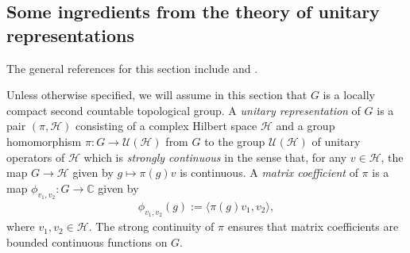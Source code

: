 \documentclass[psamsfonts]{amsart}
\theoremstyle{definition}
\theoremstyle{remark}
\numberwithin{equation}{section}
\begin{document}
\subsection{Some ingredients from the theory of unitary representations}
The general references for this section include \cite{BdV} and \cite{Kn2}.
\par 
Unless otherwise specified, we will assume in this section that $G$ is a locally compact second countable topological group. A \emph{unitary representation} of $G$ is a pair $(\pi, \mathcal{H})$ consisting of a complex Hilbert space $\mathcal{H}$ and a group homomorphism $\pi : G \rightarrow \mathcal{U}(\mathcal{H})$ from $G$ to the group $\mathcal{U}(\mathcal{H})$ of unitary operators of $\mathcal{H}$ which is \emph{strongly continuous} in the sense that, for any $v \in \mathcal{H}$, the map $G \rightarrow \mathcal{H}$ given by $g \mapsto \pi(g)v$ is continuous. A \emph{matrix coefficient} of $\pi$ is a map $\phi_{v_{1}, v_{2}} : G \rightarrow \mathbb{C}$ given by
\begin{align*}
\phi_{v_{1}, v_{2}}(g) := \langle \pi(g)v_{1}, v_{2} \rangle,
\end{align*} where $v_{1}, v_{2} \in \mathcal{H}$. The strong continuity of $\pi$ ensures that matrix coefficients are bounded continuous functions on $G$.
\par 
\end{document}
